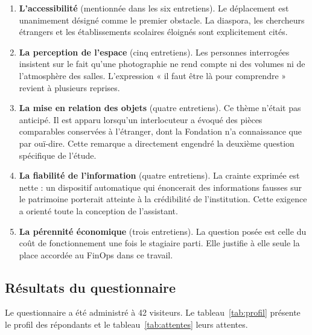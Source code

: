 \begin{enumerate}
  \item \textbf{L'accessibilité} (mentionnée dans les six entretiens). Le
        déplacement est unanimement désigné comme le premier obstacle. La
        diaspora, les chercheurs étrangers et les établissements scolaires
        éloignés sont explicitement cités.

  \item \textbf{La perception de l'espace} (cinq entretiens). Les personnes
        interrogées insistent sur le fait qu'une photographie ne rend compte ni
        des volumes ni de l'atmosphère des salles. L'expression « il faut être
        là pour comprendre » revient à plusieurs reprises.

  \item \textbf{La mise en relation des objets} (quatre entretiens). Ce thème
        n'était pas anticipé. Il est apparu lorsqu'un interlocuteur a évoqué des
        pièces comparables conservées à l'étranger, dont la Fondation n'a
        connaissance que par ouï-dire. Cette remarque a directement engendré la
        deuxième question spécifique de l'étude.

  \item \textbf{La fiabilité de l'information} (quatre entretiens). La crainte
        exprimée est nette : un dispositif automatique qui énoncerait des
        informations fausses sur le patrimoine porterait atteinte à la
        crédibilité de l'institution. Cette exigence a orienté toute la
        conception de l'assistant.

  \item \textbf{La pérennité économique} (trois entretiens). La question posée
        est celle du coût de fonctionnement une fois le stagiaire parti. Elle
        justifie à elle seule la place accordée au FinOps dans ce travail.
\end{enumerate}

\subsection{Résultats du questionnaire}

Le questionnaire a été administré à 42 visiteurs. Le
tableau~\ref{tab:profil} présente le profil des répondants et le
tableau~\ref{tab:attentes} leurs attentes.


